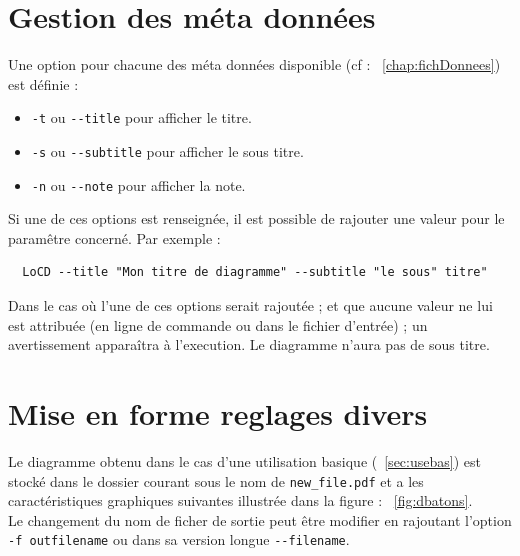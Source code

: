 \section{Gestion des méta données}
Une option pour chacune des méta données disponible (cf : ~\ref{chap:fichDonnees}) est définie :
\begin{itemize}
\item
\verb+-t+ ou \verb+--title+ pour afficher le titre.
\item
\verb+-s+ ou \verb+--subtitle+ pour afficher le sous titre.
\item
\verb+-n+ ou \verb+--note+ pour afficher la note.
\end{itemize}
Si une de ces options est renseignée, il est possible de rajouter une valeur pour le paramêtre concerné. Par exemple : 
\begin{verbatim}
  LoCD --title "Mon titre de diagramme" --subtitle "le sous" titre"
\end{verbatim} 
Dans le cas où l'une de ces options serait rajoutée ; et que aucune valeur ne lui est attribuée (en ligne de commande ou dans le fichier d'entrée) ; un avertissement apparaîtra à l'execution. Le diagramme n'aura pas de sous titre.\label{err:optmissing} %

\section{Mise en forme reglages divers}
Le diagramme obtenu dans le cas d'une utilisation basique (~\ref{sec:usebas}) est stocké dans le dossier courant sous le nom de \verb+new_file.pdf+ et a les caractéristiques graphiques suivantes illustrée dans la figure :  ~\ref{fig:dbatons}.\\ Le changement du nom de ficher de sortie peut être modifier en rajoutant l'option \verb+-f outfilename+ ou dans sa version longue \verb+--filename+. 
